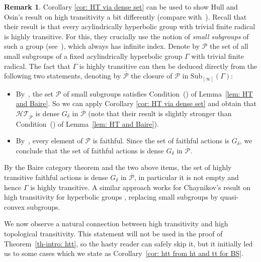 \documentclass[12pt]{article}
\numberwithin{equation}{section}
\theoremstyle{definition}
\newtheorem{remark}[equation]{Remark}
\newcommand{\Sub}{\mathrm{Sub}}
\begin{document}
\begin{remark}\label{rmk: ht for hull osin}
	Corollary \ref{cor: HT via dense set} can be used to show Hull and Osin's result on 
	high transitivity a bit differently (compare with~\cite[Sec.~3.3]{hullTransitivitydegreescountable2016}). 
	Recall that their result is that every acylindrically hyperbolic group
	with trivial finite radical is highly transitive.
	For this, they crucially use the notion of \emph{small subgroups}
	of such a group (see~\cite[Definition~2.10]{hullTransitivitydegreescountable2016}),
	which always has infinite index. 
	Denote by \( \mathcal P \) the set of all small subgroups of 
	a fixed acylindrically hyperbolic group \( \Gamma \) with trivial
	finite radical.  
	The fact that \( \Gamma \) is highly transitive
	can then be deduced directly from the following two statements,
	denoting by \(\overline{\mathcal P}\) the closure of \(\mathcal P\) 
	in \(\Sub_{[\infty]}(\Gamma)\):
	\begin{itemize}
		\item  By~\cite[Prop.~3.1]{hullTransitivitydegreescountable2016},
		    the set \( \mathcal P \) of small subgroups satisfies Condition~(\textasteriskcentered) of Lemma~\ref{lem: HT and Baire}.
			So we can apply Corollary \ref{cor: HT via dense set} and obtain that \(\mathcal{HT}_{\overline{\mathcal P}}\) 
			is dense \( G_\delta \) in \( \overline{\mathcal{P}} \)
			(note that their result is slightly stronger than  Condition~(\textasteriskcentered) of Lemma~\ref{lem: HT and Baire}).
		\item By~\cite[Lem.~2.11]{hullTransitivitydegreescountable2016}, every 
		element of \(\mathcal P\) is faithful. Since the set of faithful actions 
		is \( G_\delta \), we conclude that the set of faithful actions
		is dense \(G_\delta \) in \(\overline{\mathcal P}\).
	\end{itemize}
	By the Baire category theorem and the two above items, the set of highly transitive faithful actions
	is dense \( G_\delta \) in \(\overline{\mathcal P}\), in particular it is not empty and hence
	\( \Gamma \) is highly transitive. 
	A similar approach works for Chaynikov's 
	result on high transitivity for hyperbolic groups \cite{chaynikov_properties_2012}, 
	replacing 
	small subgroups by quasi-convex subgroups.
\end{remark}


We now observe a natural connection between high transitivity and high topological transitivity.
This statement will not be used in the proof of Theorem~\ref{th-intro: htt}, so the hasty reader can safely skip it, but it initially led us to some
cases which we state as Corollary~\ref{cor: htt from ht and tt for BS}.
\end{document}

